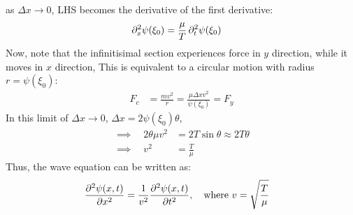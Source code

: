 as $\Delta x \to 0$, LHS becomes the derivative of the first derivative:
\begin{align}
  \pdif[2]{x} \psi(\xi_0) & = \frac{\mu}{T} \pdif[2]{t} \psi(\xi_0)
\end{align}
Now, note that the infinitisimal section experiences force in $y$ direction, while it moves in $x$ direction,
This is equivalent to a circular motion with radius $r = \psi(\xi_0)$:
\begin{align}
  F_c & = \frac{mv^2}{r} = \frac{\mu \Delta x v^2}{\psi(\xi_0)} = F_y
\end{align}
In this limit of $\Delta x \to 0$, $\Delta x = 2 \psi(\xi_0) \theta$,
\begin{align}
  \implies \quad 2 \theta \mu v^2 & = 2 T \sin \theta \approx 2 T \theta \\
  \implies \quad v^2              & = \frac{T}{\mu}
\end{align}
Thus, the wave equation can be written as:
\begin{align}
  \pdv[2]{\psi(x, t)}{x} & = \frac{1}{v^2} \pdv[2]{\psi(x, t)}{t}, \quad \text{where } v = \sqrt{\frac{T}{\mu}}
\end{align}



